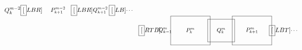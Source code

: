 \documentclass[12pt]{article}
\begin{document}
\begin{enumerate}
\begin{equation}
\begin{split}
{\begin{minipage}[c][3em][c]{3em}
                $Q^{m-2}_k$
              \end{minipage}
            }\hspace*{-1ex}
            \fbox[LBR]{
              \begin{minipage}[c][4em][c]{5em}\small\centering
                $P^{m-2}_{k+1}$
              \end{minipage}
            }
            \hspace*{-1ex}
            \fbox[LBR]{
              \begin{minipage}[c][3em][c]{3em}\small
                $Q^{m-2}_{k+1}$
              \end{minipage}
            }
            \hspace*{-1ex}
            \fbox[LB]{
              \begin{minipage}[c][4em][c]{2em}\small
                \dots
              \end{minipage}
            }\\[-1.5em]
            &
            \fbox[RTB]{
              \begin{minipage}[c][3em][c]{2em}\small
                \hspace*{-.7em}
                $Q^{m}_{k-1}$
              \end{minipage}
            }
            \hspace*{-1ex}
            \fbox{
              \begin{minipage}[c][4em][c]{5em}\small\centering
                $P^{m}_k$
              \end{minipage}
            }
            \hspace*{-1ex}
            \fbox{
              \begin{minipage}[c][3em][c]{3em}\small\centering
                $Q^{m}_{k}$
              \end{minipage}
            }
            \hspace*{-1ex}
            \fbox{
              \begin{minipage}[c][4em][c]{5em}\small\centering
                $P^{m}_{k+1}$
              \end{minipage}
            }
            \hspace*{-1ex}
            \fbox[LBT]{
              \begin{minipage}[c][3em][c]{1em}\small
                \dots
              \end{minipage}
            }\\[-1.5em]

\end{split}
\end{equation}
\end{enumerate}
\end{document}
